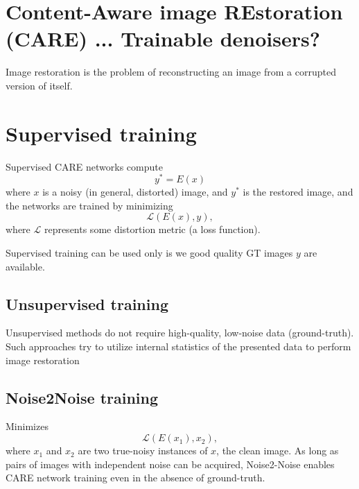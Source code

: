 \chapter{Content-Aware image REstoration (CARE) ... Trainable denoisers?}

Image restoration is the problem of reconstructing an image from a corrupted version of itself. %

\chapter{Supervised training}

Supervised CARE networks compute
\begin{equation}
  y^* = E(x)
\end{equation}
where $x$ is a noisy (in general, distorted) image, and $y^*$ is the restored image, and the networks are trained by minimizing
\begin{equation}
  \mathcal{L}(E(x), y),
\end{equation}
where $\mathcal{L}$ represents some distortion metric (a loss
function). %

Supervised training can be used only is we good quality GT images $y$
are
available. %

\section{Unsupervised training}

Unsupervised methods do not require high-quality, low-noise data
(ground-truth).  Such approaches try to utilize internal statistics of
the presented data to perform image
restoration %

\section{Noise2Noise training}

Minimizes
\begin{equation}
  {\mathcal L}(E(x_1),x_2),
\end{equation}
where $x_1$ and $x_2$ are two true-noisy instances of $x$, the clean
image. As long as pairs of images with independent noise can be
acquired, Noise2-Noise enables CARE network training even in the
absence of ground-truth. %

